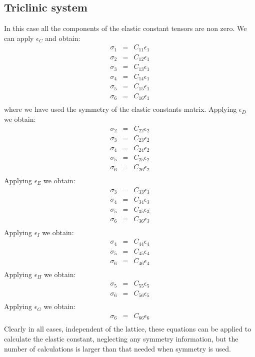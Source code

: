 \documentclass[12pt,a4paper]{article}
\begin{document}
\subsection{\color{web-blue}Triclinic system}
In this case all the components of the elastic constant tensors are non zero.
We can apply $\epsilon_C$ and obtain:
\begin{eqnarray}
\sigma_1&=&C_{11} \epsilon_1  \\
\sigma_2&=&C_{12} \epsilon_1  \\
\sigma_3&=&C_{13} \epsilon_1  \\
\sigma_4&=&C_{14} \epsilon_1  \\
\sigma_5&=&C_{15} \epsilon_1  \\
\sigma_6&=&C_{16} \epsilon_1  \\
\end{eqnarray}
where we have used the symmetry of the elastic constants matrix.
Applying $\epsilon_D$ we obtain:
\begin{eqnarray}
\sigma_2&=&C_{22} \epsilon_2  \\
\sigma_3&=&C_{23} \epsilon_2  \\
\sigma_4&=&C_{24} \epsilon_2  \\
\sigma_5&=&C_{25} \epsilon_2  \\
\sigma_6&=&C_{26} \epsilon_2  \\
\end{eqnarray}
Applying $\epsilon_E$ we obtain:
\begin{eqnarray}
\sigma_3&=&C_{33} \epsilon_3  \\
\sigma_4&=&C_{34} \epsilon_3  \\
\sigma_5&=&C_{35} \epsilon_3  \\
\sigma_6&=&C_{36} \epsilon_3  \\
\end{eqnarray}
Applying $\epsilon_I$ we obtain:
\begin{eqnarray}
\sigma_4&=&C_{44} \epsilon_4  \\
\sigma_5&=&C_{45} \epsilon_4  \\
\sigma_6&=&C_{46} \epsilon_4  \\
\end{eqnarray}
Applying $\epsilon_H$ we obtain:
\begin{eqnarray}
\sigma_5&=&C_{55} \epsilon_5  \\
\sigma_6&=&C_{56} \epsilon_5  \\
\end{eqnarray}
Applying $\epsilon_G$ we obtain:
\begin{eqnarray}
\sigma_6&=&C_{66} \epsilon_6  \\
\end{eqnarray}
Clearly in all cases, independent of the lattice, these equations can be
applied to calculate the elastic constant, neglecting any symmetry
information, but the number of calculations is larger than that needed
when symmetry is used.
\end{document}
